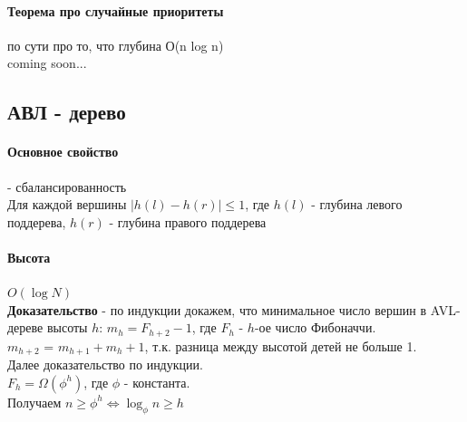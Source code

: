 \documentclass[a4paper,10pt]{article}
\begin{document}
\paragraph{Теорема про случайные приоритеты} по сути про то, что глубина О(n log n)\\
coming soon...\\

\subsection{АВЛ - дерево}

	\paragraph{Основное свойство} - сбалансированность \\
	Для каждой вершины $|h(l) - h(r)| \leq 1$, где $h(l)$ - глубина левого поддерева, $h(r)$ - глубина правого поддерева \\
	
	\paragraph{Высота} $O(\log N)$ \\
	\textbf{Доказательство} - по индукции докажем, что минимальное число вершин в AVL-дереве высоты $h$: $m_{h} = F_{h+2} - 1$, где $F_{h}$ - $h$-ое число Фибоначчи. \\
	$m_{h+2}$ = $m_{h+1} + m_{h} + 1$, т.к. разница между высотой детей не больше 1. \\
	Далее доказательство по индукции.\\
	$F_{h} = \Omega(\phi^{h})$, где $\phi$ - константа. \\
	Получаем $n \geq \phi^{h} \Leftrightarrow \log_{\phi} n \geq h$ \\
	
\end{document}
